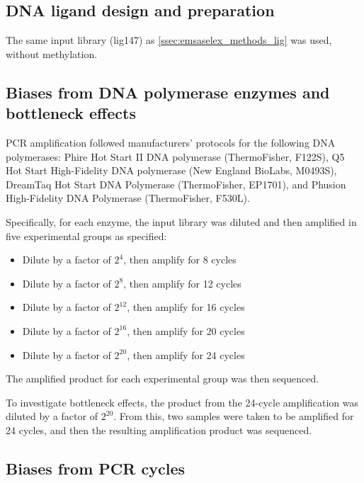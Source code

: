 \documentclass[parskip=full, numbers=noenddot]{scrbook}
\begin{document}
\subsection{DNA ligand design and preparation}
\label{ssec:pcrbias_methods_lig}

The same input library (lig147) as \ref{ssec:emsaselex_methods_lig} was used, without methylation.

\subsection{Biases from DNA polymerase enzymes and bottleneck effects}
\label{ssec:pcrbias_methods_enz}

PCR amplification followed manufacturers' protocols for the following DNA polymerases: Phire Hot Start II DNA polymerase (ThermoFisher, F122S), Q5 Hot Start High-Fidelity DNA polymerase (New England BioLabs, M0493S), DreamTaq Hot Start DNA Polymerase (ThermoFisher, EP1701), and Phusion High-Fidelity DNA Polymerase (ThermoFisher, F530L).

Specifically, for each enzyme, the input library was diluted and then amplified in five experimental groups as specified:

\begin{itemize}
  \item Dilute by a factor of $2^{4}$, then amplify for 8 cycles
  \item Dilute by a factor of $2^{8}$, then amplify for 12 cycles
  \item Dilute by a factor of $2^{12}$, then amplify for 16 cycles
  \item Dilute by a factor of $2^{16}$, then amplify for 20 cycles
  \item Dilute by a factor of $2^{20}$, then amplify for 24 cycles
\end{itemize}

The amplified product for each experimental group was then sequenced.

To investigate bottleneck effects, the product from the 24-cycle amplification was diluted by a factor of $2^{20}$.  From this, two samples were taken to be amplified for 24 cycles, and then the resulting amplification product was sequenced.

\subsection{Biases from PCR cycles}
\label{ssec:pcrbias_methods_pcr}
\end{document}
